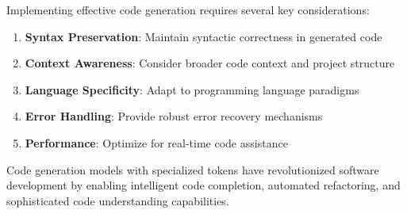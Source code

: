 Implementing effective code generation requires several key considerations:

\begin{enumerate}
\item \textbf{Syntax Preservation}: Maintain syntactic correctness in generated code
\item \textbf{Context Awareness}: Consider broader code context and project structure
\item \textbf{Language Specificity}: Adapt to programming language paradigms
\item \textbf{Error Handling}: Provide robust error recovery mechanisms
\item \textbf{Performance}: Optimize for real-time code assistance
\end{enumerate}

Code generation models with specialized tokens have revolutionized software development by enabling intelligent code completion, automated refactoring, and sophisticated code understanding capabilities.